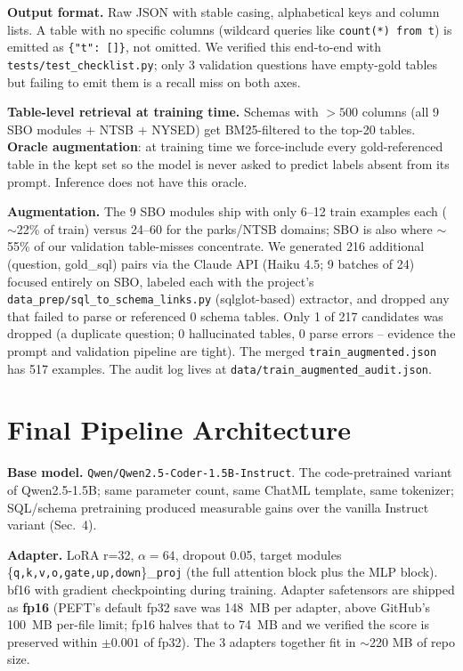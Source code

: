 \documentclass[10pt]{article}
\begin{document}
\textbf{Output format.} Raw JSON with stable casing, alphabetical keys and column
lists. A table with no specific columns (wildcard queries like \texttt{count(*) from
t}) is emitted as \texttt{\{"t": []\}}, not omitted. We verified this end-to-end
with \texttt{tests/test\_checklist.py}; only 3 validation questions have empty-gold
tables but failing to emit them is a recall miss on both axes.

\textbf{Table-level retrieval at training time.} Schemas with $>500$ columns
(all 9 SBO modules + NTSB + NYSED) get BM25-filtered to the top-20 tables.
\textbf{Oracle augmentation}: at training time we force-include every
gold-referenced table in the kept set so the model is never asked to predict
labels absent from its prompt. Inference does not have this oracle.

\textbf{Augmentation.} The 9 SBO modules ship with only 6--12 train examples each
($\sim$22\% of train) versus 24--60 for the parks/NTSB domains; SBO is also where
$\sim$55\% of our validation table-misses concentrate. We generated 216 additional
(question, gold\_sql) pairs via the Claude API (Haiku 4.5; 9 batches of 24)
focused entirely on SBO, labeled each with the project's
\texttt{data\_prep/sql\_to\_schema\_links.py} (sqlglot-based) extractor, and dropped any
that failed to parse or referenced 0 schema tables. Only 1 of 217 candidates was
dropped (a duplicate question; 0 hallucinated tables, 0 parse errors -- evidence
the prompt and validation pipeline are tight). The merged
\texttt{train\_augmented.json} has 517 examples. The audit log lives at
\texttt{data/train\_augmented\_audit.json}.

\section{Final Pipeline Architecture}

\textbf{Base model.} \texttt{Qwen/Qwen2.5-Coder-1.5B-Instruct}. The code-pretrained
variant of Qwen2.5-1.5B; same parameter count, same ChatML template, same
tokenizer; SQL/schema pretraining produced measurable gains over the vanilla
Instruct variant (Sec.~4).

\textbf{Adapter.} LoRA r=32, $\alpha=64$, dropout 0.05, target modules
\{\texttt{q,k,v,o,gate,up,down}\}\_\texttt{proj} (the full attention block plus
the MLP block). bf16 with gradient checkpointing during training. Adapter
safetensors are shipped as \textbf{fp16} (PEFT's default fp32 save was 148~MB
per adapter, above GitHub's 100~MB per-file limit; fp16 halves that to 74~MB
and we verified the score is preserved within $\pm 0.001$ of fp32). The 3
adapters together fit in $\sim$220 MB of repo size.
\end{document}
